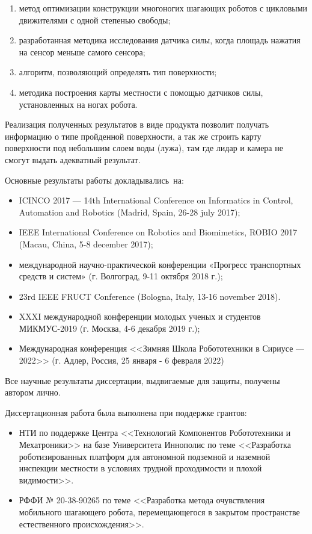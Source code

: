 {}
\begin{enumerate}[beginpenalty=10000] %
  \item метод оптимизации конструкции многоногих шагающих роботов с цикловыми движителями с одной степенью свободы;
  \item разработанная методика исследования датчика силы, когда площадь нажатия на сенсор меньше самого сенсора;
  \item алгоритм, позволяющий определять тип поверхности;
  \item методика построения карты местности с помощью датчиков силы, установленных на ногах робота.
\end{enumerate}


{\influence} Реализация полученных результатов в виде продукта позволит получать информацию о типе пройденной поверхности, а так же строить карту поверхности под небольшим слоем воды (лужа), там где лидар и камера не смогут выдать адекватный результат.


{\probation}
Основные результаты работы докладывались~на:
\begin{itemize}
  \item ICINCO 2017 --- 14th International Conference on Informatics in Control, Automation and Robotics (Madrid, Spain, 26-28 july 2017);
  \item IEEE International Conference on Robotics and Biomimetics, ROBIO 2017 (Macau, China, 5-8 december 2017);
  \item  международной  научно-практической  конференции  «Прогресс  транспортных 
  средств и систем» (г. Волгоград, 9-11 октября 2018 г.);
  \item 23rd IEEE FRUCT Conference (Bologna, Italy, 13-16 november 2018).
  \item XXXI международной конференции молодых ученых и студентов МИКМУС-2019 
  (г. Москва, 4-6 декабря 2019 г.);
  \item Международная конференция <<Зимняя Школа Робототехники в Сириусе --- 2022>> (г. Адлер, Россия, 25 января - 6 февраля 2022)
\end{itemize}

{\contribution} Все научные результаты диссертации, выдвигаемые для защиты, получены автором лично.

\ifsynopsis

\fi

Диссертационная работа была выполнена при поддержке грантов:
\begin{itemize}
    \item НТИ по поддержке Центра <<Технологий Компонентов Робототехники и Мехатроники>> на базе Университета Иннополис по теме <<Разработка роботизированных платформ для автономной подземной и наземной инспекции местности в условиях трудной проходимости и плохой видимости>>. 
    \item РФФИ № 20-38-90265 по теме <<Разработка метода очувствления мобильного шагающего робота, перемещающегося в закрытом пространстве естественного происхождения>>.
\end{itemize}


